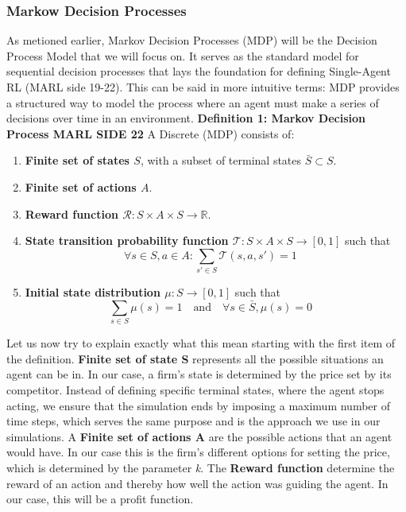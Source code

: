 \documentclass{article}
\begin{document}
\subsubsection{Markow Decision Processes}
As metioned earlier, Markov Decision Processes (MDP) will be the Decision Process Model that we will focus on. It serves as the standard model for sequential decision processes that lays the foundation for
defining Single-Agent RL (MARL side 19-22). This can be said in more intuitive terms: MDP provides a structured way to model the process where an agent must make a series of decisions over time in an environment.
\newline
\textbf{Definition 1: Markov Decision Process MARL SIDE 22} A Discrete (MDP) consists of:
\begin{enumerate}
    \item \textbf{Finite set of states \( S \)}, with a subset of terminal states \( \bar{S} \subset S \).
    \item \textbf{Finite set of actions \( A \)}.
    \item \textbf{Reward function \( \mathcal{R}: S \times A \times S  \to \mathbb{R} \)}.
    \item \textbf{State transition probability function \( \mathcal{T}: S \times A \times S \to [0, 1] \)} such that
    \[
    \forall s \in S, a \in A : \sum_{s' \in S} \mathcal{T}(s, a, s') = 1 \quad 
    \]
    \item \textbf{Initial state distribution \( \mu: S \to [0, 1] \)} such that
    \[
    \sum_{s \in S} \mu(s) = 1 \quad \text{and} \quad \forall s \in \bar{S}, \mu(s) = 0 \quad 
    \]
\end{enumerate}
Let us now try to explain exactly what this mean starting with the first item of the definition.
\newline 
\textbf{Finite set of state S} represents all the possible situations an agent can be in. In our case, a firm's state is determined by the price set by its competitor. Instead of defining specific terminal states, where the agent stops acting, we ensure that the simulation ends by imposing a maximum number of time steps, which serves the same purpose and is the approach we use in our simulations.
\newline
A \textbf{Finite set of actions A} are the possible actions that an agent would have. In our case this is the firm's different options for setting the price, which is determined by the parameter \textit{k}. 
\newline
The \textbf{Reward function} determine the reward of an action and thereby how well the action was guiding the agent. In our case, this will be a profit function. 
\end{document}
